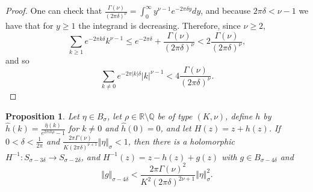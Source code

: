 \documentclass{article}
\newcommand{\norm}[1]{\Vert #1 \Vert}
\newtheorem{prop}[theorem]{Proposition}
\begin{document}
\begin{proof}
One can check that $\frac{\Gamma(\nu)}{(2\pi \delta)^\nu}= \int_0^\infty y^{\nu-1} e^{-2\pi \delta y} dy$,
and because $2\pi\delta<\nu-1$ we have that for $y \geq 1$ the integrand is decreasing.
 Therefore, since $\nu \geq 2$,
 \[
\sum_{k \geq 1} e^{-2\pi k\delta} k^{\nu-1} \leq e^{-2\pi \delta} +\frac{\Gamma(\nu)}{(2\pi \delta)^\nu}
<2\frac{\Gamma(\nu)}{(2\pi \delta)^\nu},
 \]
 and so
 \[
  \sum_{k \neq 0} e^{-2\pi |k|\delta} |k|^{\nu-1} < 4\frac{\Gamma(\nu)}{(2\pi \delta)^\nu}.
 \]
 \end{proof}
 
 \begin{prop}
 \label{gestimate}
 Let $\eta \in B_\sigma$, let $\rho \in \mathbb{R} \setminus \mathbb{Q}$ be of type $(K,\nu)$, define $h$ by
$\widehat{h}(k)=\frac{\widehat{\eta}(k)}{e^{2\pi i k\rho}-1}$ for $k \neq 0$ and $\widehat{h}(0)=0$,
and let $H(z)=z+h(z)$.
If $0<\delta<\frac{1}{2\pi}$ and $\frac{2\pi \Gamma(\nu)}{K(2\pi \delta)^{\nu+1}}\norm{\eta}_{\sigma}<1$, then there is a holomorphic $H^{-1}:
S_{\sigma-3\delta} \to S_{\sigma-2\delta}$,
and $H^{-1}(z)=z-h(z)+g(z)$ with $g \in B_{\sigma-4\delta}$ and
\[
\norm{g}_{\sigma-4\delta} < \frac{2\pi \Gamma(\nu)^2}{K^2(2\pi \delta)^{2\nu+1}}\norm{\eta}_\sigma^2.
\]
  \end{prop}
\end{document}
